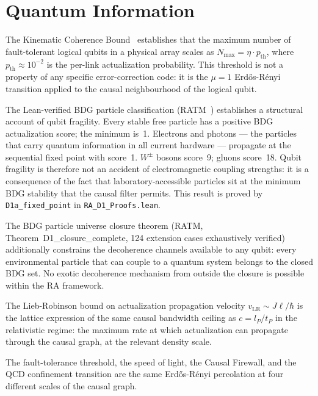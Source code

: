 \documentclass[11pt,a4paper]{article}
\begin{document}
\section{Quantum Information}
\label{sec:QI}

The Kinematic Coherence Bound~\citep{Sandeman2026RAQI} establishes
that the maximum number of fault-tolerant logical qubits in a physical
array scales as $N_{\max} = \eta \cdot p_{\mathrm{th}}$, where
$p_{\mathrm{th}} \approx 10^{-2}$ is the per-link actualization
probability. This threshold is not a property of any specific
error-correction code: it is the $\mu = 1$ Erd\H{o}s-R\'{e}nyi
transition applied to the causal neighbourhood of the logical qubit.

The Lean-verified BDG particle classification (RATM~\citep{Sandeman2026RATM})
establishes a structural account of qubit fragility. Every stable free
particle has a positive BDG actualization score; the minimum is~1.
Electrons and photons --- the particles that carry quantum information
in all current hardware --- propagate at the sequential fixed point
with score~1. $W^\pm$ bosons score~9; gluons score~18. Qubit fragility
is therefore not an accident of electromagnetic coupling strengths: it
is a consequence of the fact that laboratory-accessible particles sit at
the minimum BDG stability that the causal filter permits. This result is
proved by \texttt{D1a\_fixed\_point} in \texttt{RA\_D1\_Proofs.lean}.

The BDG particle universe closure theorem (RATM, Theorem~D1\_closure\_complete,
124 extension cases exhaustively verified) additionally constrains the
decoherence channels available to any qubit: every environmental particle
that can couple to a quantum system belongs to the closed BDG set.
No exotic decoherence mechanism from outside the closure is possible
within the RA framework.

The Lieb-Robinson bound on actualization propagation velocity
$v_{\mathrm{LR}} \sim J\ell/\hbar$ is the lattice expression of the
same causal bandwidth ceiling as $c = l_P/t_P$ in the relativistic
regime: the maximum rate at which actualization can propagate through
the causal graph, at the relevant density scale.

The fault-tolerance threshold, the speed of light, the Causal Firewall,
and the QCD confinement transition are the same Erd\H{o}s-R\'{e}nyi
percolation at four different scales of the causal graph.
\end{document}
